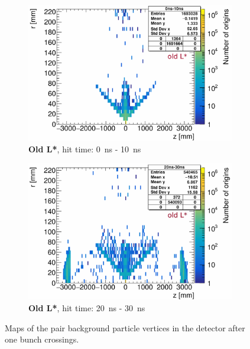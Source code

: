 \begin{figure}
     \begin{subfigure}[b]{0.49\textwidth}
   \centering
    \includegraphics[width=\textwidth]{Figures/Pairs/hitmaps_particleorigins_hittime_0ns-10ns_SiVertexBarrelSiVertexEndcap_oldLStar.pdf}
   \caption{\textbf{Old L*}, hit time: \SI[detect-all]{0}{\nano\second} - \SI[detect-all]{10}{\nano\second}}
   \end{subfigure}
   \hfill
    \begin{subfigure}[b]{0.49\textwidth}
   \centering
    \includegraphics[width=\textwidth]{Figures/Pairs/hitmaps_particleorigins_hittime_20ns-30ns_SiVertexBarrelSiVertexEndcap_oldLStar.pdf}
   \caption{\textbf{Old L*}, hit time: \SI[detect-all]{20}{\nano\second} - \SI[detect-all]{30}{\nano\second}}
   \end{subfigure}
   \caption[Pair background vertex maps in the \sid detector]{Maps of the pair background particle vertices in the \sid detector after one bunch crossings.
}
\end{figure}
